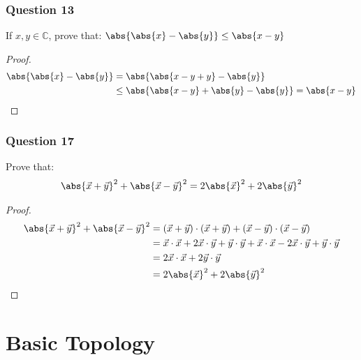 \documentclass[12pt, letterpaper]{paper}
\begin{document}
\subsubsection{Question 13}
\label{sec:org654cb1f}
\begin{question}
  If $x,y \in \mathbb{C}$, prove that:
  $\abs{ \abs{x} - \abs{y} } \leq \abs{x - y}$
\end{question}
\begin{proof}
  \begin{align*}
    \abs{ \abs{x} - \abs{y} } &= \abs{ \abs{x - y + y } - \abs{y} } \\
                              &\leq \abs{ \abs{ x - y } + \abs{y} - \abs{y} } = \abs{ x - y}
  \end{align*}
\end{proof}


\subsubsection{Question 17}
\label{sec:orgb1daeda}
\begin{question}
  Prove that:
  \begin{align*}
    \abs{\vec{x}+\vec{y}}^2 + \abs{\vec{x} - \vec{y}}^2 = 2\abs{\vec{x}}^2 + 2\abs{\vec{y}}^2
  \end{align*}
\end{question}
\begin{proof}
  \begin{align*}
    \abs{\vec{x}+\vec{y}}^2 + \abs{\vec{x} - \vec{y}}^2 &= (\vec{x} + \vec{y} )\cdot(\vec{x} + \vec{y}) + (\vec{x} - \vec{y})\cdot(\vec{x}-\vec{y})\\
                                                        &= \vec{x}\cdot \vec{x} + 2 \vec{x} \cdot \vec{y} + \vec{y} \cdot \vec{y} + \vec{x} \cdot \vec{x} - 2 \vec{x} \cdot \vec{y} + \vec{y} \cdot \vec{y}\\
                                                        &= 2 \vec{x} \cdot \vec{x} + 2 \vec{y} \cdot \vec{y} \\
                                                        &= 2 \abs{ \vec{x} }^2 + 2 \abs{ \vec{y} }^2\\
  \end{align*}
\end{proof}

\section{Basic Topology}
\label{sec:org6238b3c}
\end{document}
